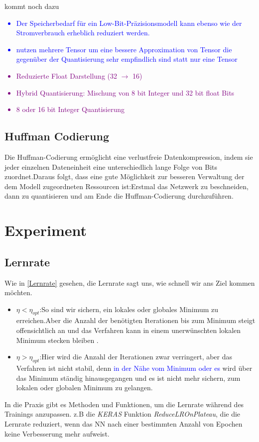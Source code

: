 \documentclass[12pt,a4paper]{scrartcl}
\numberwithin{equation}{section}
\begin{document}
\begin{center}
	kommt noch dazu
\end{center}
\textcolor{blue}{
	\begin{itemize}
		\item  Der Speicherbedarf für ein Low-Bit-Präzisionsmodell kann ebenso wie der Stromverbrauch erheblich reduziert werden.
		\item nutzen mehrere Tensor um eine bessere Approximation von Tensor die gegenüber der Quantisierung sehr empfindlich sind statt nur eine Tensor 
\end{itemize}}

\textcolor{purple}{
	\begin{itemize}
		\item Reduzierte Float Darstellung (32 $\rightarrow$ 16)
		\item Hybrid Quantisierung: Mischung von 8 bit Integer und 32 bit float Bits
		\item 8 oder 16 bit Integer Quantisierung 
\end{itemize}}
\subsection{Huffman Codierung}
Die Huffman-Codierung ermöglicht eine verlustfreie Datenkompression, indem sie jeder einzelnen Dateneinheit  eine unterschiedlich lange Folge von Bits zuordnet.Daraus folgt, dass eine gute Möglichkeit zur besseren Verwaltung der dem Modell zugeordneten Ressourcen ist:Erstmal das Netzwerk zu beschneiden, dann zu quantisieren und am Ende die Huffman-Codierung durchzuführen. 

\section{Experiment} \label{Experiment}
\subsection{Lernrate}\label{Experiment:Lernrate}
Wie in \ref{Lernrate} gesehen, die Lernrate sagt uns, wie schnell wir ans Ziel kommen möchten.
\begin{itemize}
	\item $ \eta < \eta_{opt} $:So sind wir sichern, ein lokales oder globales Minimum zu erreichen.Aber die Anzahl der benötigten Iterationen bis zum Minimum steigt offensichtlich an und das Verfahren kann in einem unerwünschten lokalen Minimum stecken bleiben .
	\item $ \eta > \eta_{opt} $:Hier wird die Anzahl der Iterationen zwar verringert, aber das Verfahren ist nicht stabil, denn \textcolor{blue}{in der Nähe vom Minimum oder es} wird über das Minimum ständig hinausgegangen und es ist nicht mehr sichern, zum lokalen oder globalen Minimum zu gelangen.
\end{itemize}
In die Praxis gibt es Methoden und Funktionen, um die Lernrate während des Trainings anzupassen. z.B die \textit{KERAS} Funktion \textit{ReduceLROnPlateau}, die die Lernrate reduziert, wenn das \ac{NN} nach einer bestimmten Anzahl von Epochen keine Verbesserung mehr aufweist.
\end{document}
